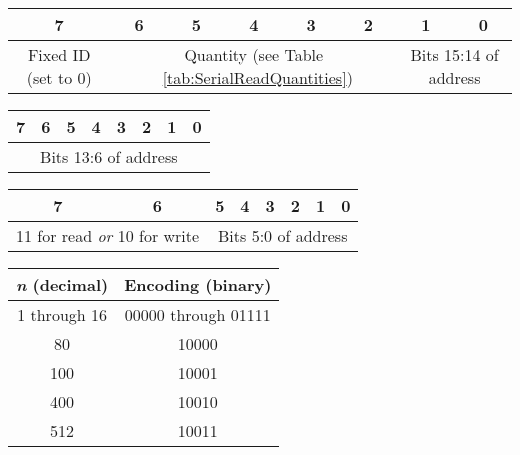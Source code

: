 \documentclass[11pt,twocolumn]{scrartcl}
\begin{document}
\begin{figure*}
 \centering
 \begin{tabular}{|c|c|c|c|c|c|c|c|}
  \hline
  \bfseries{7} & \bfseries{6} & \bfseries{5} & \bfseries{4} &
  \bfseries{3} & \bfseries{2} & \bfseries{1} & \bfseries{0}  \\ \hline
  Fixed ID (set to 0) & \multicolumn{5}{|c|}{Quantity (see Table ~\ref{tab:SerialReadQuantities})} & \multicolumn{2}{|c|}{Bits 15:14 of address} \\ \hline
 \end{tabular}
 \caption{Serial protocol, Command Byte A
 \label{fig:CommandByteA}}

 \centering
 \begin{tabular}{|c|c|c|c|c|c|c|c|}
  \hline
  \bfseries{7} & \bfseries{6} & \bfseries{5} & \bfseries{4} &
  \bfseries{3} & \bfseries{2} & \bfseries{1} & \bfseries{0}  \\ \hline
  \multicolumn{8}{|c|}{Bits 13:6 of address} \\ \hline
 \end{tabular}
 \caption{Serial protocol, Command Byte B
 \label{fig:CommandByteB}}

 \centering
 \begin{tabular}{|c|c|c|c|c|c|c|c|}
  \hline
  \bfseries{7} & \bfseries{6} & \bfseries{5} & \bfseries{4} &
  \bfseries{3} & \bfseries{2} & \bfseries{1} & \bfseries{0}  \\ \hline
  \multicolumn{2}{|c|}{11 for read \textit{or} 10 for write} &
  \multicolumn{6}{|c|}{Bits 5:0 of address} \\ \hline
 \end{tabular}
 \caption{Serial protocol, Command Byte C
 \label{fig:CommandByteC}}
\end{figure*}

\begin{table*}
 \centering
 \begin{tabular}{|c|c|}
  \hline
  \bfseries{\textit{n} (decimal)} & \bfseries{Encoding (binary)}  \\ \hline
  1 through 16 & 00000 through 01111 \\ \hline
  80 & 10000 \\ \hline
  100 & 10001 \\ \hline
  400 & 10010 \\ \hline
  512 & 10011 \\ \hline
 \end{tabular}
 \caption{Allowed byte quantities for serial reads
 \label{tab:SerialReadQuantities}}
\end{table*}
\end{document}
